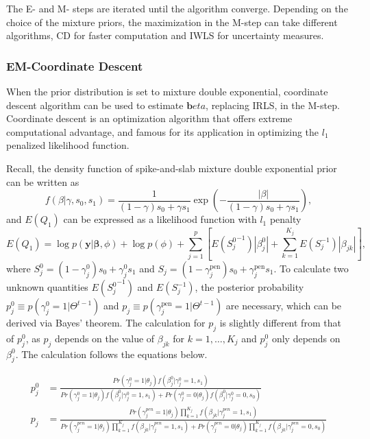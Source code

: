 \documentclass[AMA,STIX1COL,]{WileyNJD-v2}
\begin{document}
The E- and M- steps are iterated until the algorithm converge. Depending
on the choice of the mixture priors, the maximization in the M-step can
take different algorithms, CD for faster computation and IWLS for
uncertainty measures.

\hypertarget{em-coordinate-descent}{%
\subsubsection{EM-Coordinate Descent}\label{em-coordinate-descent}}

When the prior distribution is set to mixture double exponential,
coordinate descent algorithm can be used to estimate
\(\boldsymbol{b}eta\), replacing IRLS, in the M-step. Coordinate descent
is an optimization algorithm that offers extreme computational
advantage, and famous for its application in optimizing the \(l_1\)
penalized likelihood function.

Recall, the density function of spike-and-slab mixture double
exponential prior can be written as \[
f(\beta|\gamma, s_0, s_1) = \frac{1}{(1-\gamma)s_0 + \gamma s_1}\exp(-\frac{|\beta|}{(1-\gamma)s_0 + \gamma s_1}),
\] and \(E(Q_1)\) can be expressed as a likelihood function with \(l_1\)
penalty \begin{equation}\label{eq:Q1_CD}
E(Q_1) = \log p(\textbf{y}|\boldsymbol{\beta}, \phi) + \log p(\phi) + \sum\limits_{j=1}^p\left[E({S^0_j}^{-1})|\beta^0_j|+\sum\limits_{k=1}^{K_j}E(S^{-1}_{j})|\beta_{jk}|\right],
\end{equation} where
\(S_{j}^0 = (1-\gamma^{0}_{j}) s_0 + \gamma^{0}_{j} s_1\) and
\(S_{j} = (1-\gamma^\text{pen}_{j}) s_0 + \gamma^\text{pen}_{j} s_1\).
To calculate two unknown quantities \(E({S_j^0}^{-1})\) and
\(E(S^{-1}_j)\), the posterior probability
\(p^0_{j} \equiv p(\gamma^{0}_{j}=1|\Theta^{t-1})\) and
\(p_{j} \equiv p(\gamma^\text{pen}_{j}=1|\Theta^{t-1})\) are necessary,
which can be derived via Bayes' theorem. The calculation for \(p_j\) is
slightly different from that of \(p^0_j\), as \(p_j\) depends on the
value of \(\beta_{jk}\) for \(k=1, \dots, K_j\) and \(p^0_j\) only
depends on \(\beta_j^0\). The calculation follows the equations below.

\[
\begin{aligned}
p_{j}^0 &= \frac{Pr(\gamma_{j}^0 = 1|\theta_j)f(\beta_{j}^0|\gamma_{j}^0=1, s_1) }{Pr(\gamma_{j}^0 = 1|\theta_j)f(\beta_{j}^0|\gamma_{j}^0=1, s_1) + Pr(\gamma_{j}^0 = 0|\theta_j)f(\beta^0_{j}|\gamma^0_{j}=0, s_0)}\\
p_{j} &= \frac{Pr(\gamma^{pen}_{j} = 1|\theta_j)\prod\limits_{k=1}^{K_j}f(\beta_{jk}|\gamma^{pen}_{j}=1, s_1) }{Pr(\gamma^{pen}_{j} = 1|\theta_j)\prod\limits_{k=1}^{K_j}f(\beta_{jk}|\gamma^{pen}_{j}=1, s_1) + Pr(\gamma^{pen}_{j} = 0|\theta_j)\prod\limits_{k=1}^{K_j}f(\beta_{jk}|\gamma^{pen}_{j}=0, s_0)}
\end{aligned}
\]
\end{document}
